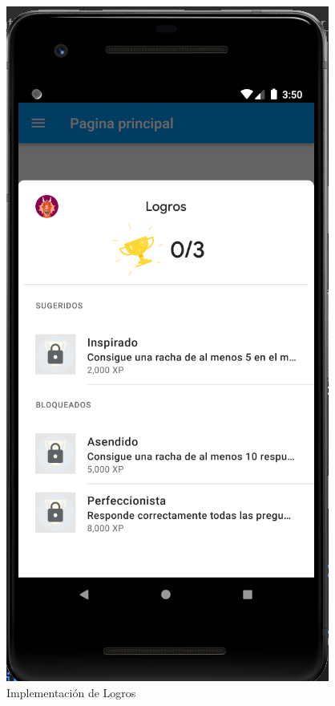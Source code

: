 \documentclass{article}
\begin{document}
\begin{figure}[H]
    \centering
    \includegraphics[scale=0.8]{imgs/Imp/Logros}
    \caption{Implementación de Logros}
\end{figure}
\end{document}
